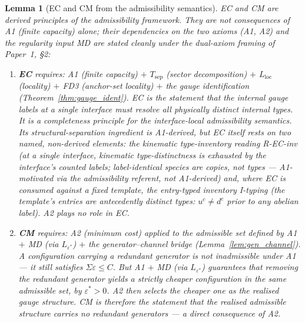 \documentclass[11pt]{article}
\newtheorem{lemma}[theorem]{Lemma}
\theoremstyle{definition}
\begin{document}
\begin{lemma}[EC and CM from the admissibility semantics]\label{lem:EC_CM_from_A1}
EC and CM are derived principles of the admissibility framework.
They are not consequences of A1 (finite capacity) alone; their
dependencies on the two axioms (A1, A2) and the regularity input MD
are stated cleanly under the dual-axiom framing of Paper~1, \S2:
\begin{enumerate}[label=(\roman*),nosep]
  \item \textbf{EC} requires: A1 (finite capacity) $+$
  $T_{\mathrm{sep}}$ (sector decomposition) $+$
  $L_{\mathrm{loc}}$ (locality) $+$ FD3 (anchor-set locality) $+$
  the gauge identification (Theorem~\ref{thm:gauge_ident}).
  EC is the statement that the internal gauge labels at a single
  interface must resolve all physically distinct internal types.
  It is a \emph{completeness principle for the interface-local
  admissibility semantics}.  Its structural-separation ingredient is
  A1-derived, but EC itself rests on two named, non-derived elements:
  the \emph{kinematic type-inventory reading} R-EC-inv (at a single
  interface, kinematic type-distinctness is exhausted by the
  interface's counted labels; label-identical species are copies, not
  types --- A1-motivated via the admissibility referent, not
  A1-derived) and, where EC is consumed against a fixed template, the
  \emph{entry-typed inventory} I-typing (the template's entries are
  antecedently distinct types: $u^c \ne d^c$ prior to any abelian
  label).  A2 plays no role in EC.
  \item \textbf{CM} requires: A2 (minimum cost) applied to the
  admissible set defined by A1 $+$ MD (via $L_{\varepsilon^*}$) $+$
  the generator--channel bridge (Lemma~\ref{lem:gen_channel}).
  A configuration carrying a redundant generator is \emph{not}
  inadmissible under A1 --- it still satisfies $\Sigma\varepsilon \le C$.
  But A1 $+$ MD (via $L_{\varepsilon^*}$) guarantees that removing the
  redundant generator yields a strictly cheaper configuration in the
  same admissible set, by $\varepsilon^* > 0$.  A2 then selects the
  cheaper one as the realised gauge structure.  CM is therefore the
  statement that the realised admissible structure carries no
  redundant generators --- a direct consequence of A2.
\end{enumerate}
\end{lemma}
\end{document}
